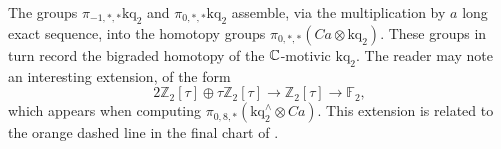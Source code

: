 \begin{rmk}
The groups $\pi_{-1,*,*}\mathrm{kq}_2$ and $\pi_{0,*,*}\mathrm{kq}_2$ assemble, via the multiplication by $a$ long exact sequence, into the homotopy groups $\pi_{0,*,*}\left(Ca \otimes \mathrm{kq}_2\right)$.  These groups in turn record the bigraded homotopy of the $\mathbb{C}$-motivic $\mathrm{kq}_2$.  The reader may note an interesting extension, of the form 
\[2 \mathbb{Z}_2[\tau] \oplus \tau \mathbb{Z}_2[\tau] \to \mathbb{Z}_2[\tau] \to \mathbb{F}_2,\]
which appears when computing $\pi_{0,8,*}(\mathrm{kq}_2^{\wedge} \otimes Ca)$.
This extension is related to the orange dashed line in the final chart of \cite{Kong}.
\end{rmk}

